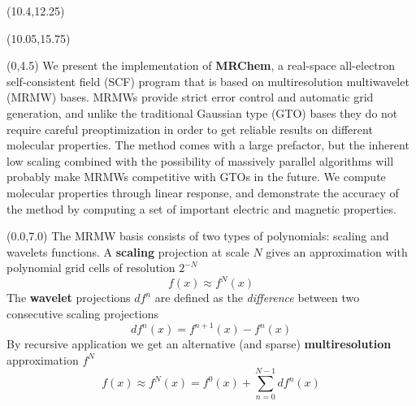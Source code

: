 \documentclass[a0,portrait]{a0poster}
\def\Subhead#1{\noindent{\large\color{DarkBlue} #1}}
\begin{document}
\begin{textblock}{5}(10.4,12.25)
\Subhead{LDA}
\end{textblock}

\begin{textblock}{5}(10.05,15.75)
\Subhead{Hartree-Fock}
\end{textblock}


\begin{textblock}{9.3}(0,4.5)
We present the implementation of \textbf{MRChem}, a real-space all-electron 
self-consistent field (SCF) program that is based on multiresolution 
multiwavelet (MRMW) bases. MRMWs provide strict error control and automatic grid
generation, and unlike the traditional Gaussian type (GTO) bases they do not 
require careful preoptimization in order to get reliable 
results on different molecular properties. The method comes with a large 
prefactor, but the inherent low scaling combined with the possibility of 
massively parallel algorithms will probably make MRMWs competitive with GTOs in 
the future. We compute molecular properties through linear response, and 
demonstrate the accuracy of the method by computing a set of
important electric and magnetic properties.
\end{textblock}

\begin{textblock}{4.3}(0.0,7.0)
The MRMW basis consists of two types of polynomials: scaling and
wavelets functions. A \textbf{scaling} projection at scale $N$ gives an 
approximation with polynomial grid cells of resolution $2^{-N}$
\begin{equation}
	f(x) \approx f^N(x) 
\end{equation}
The \textbf{wavelet} projections $df^n$ are defined as the \emph{difference} 
between two consecutive scaling projections
\begin{equation}
	\label{eq:wavelet}
	df^n(x) = f^{n+1}(x) - f^n(x)
\end{equation}
By recursive application we get an alternative (and sparse)
\textbf{multiresolution} approximation $f^N$
\begin{equation}
	\label{eq:multires}
	f(x) \approx f^N(x) = f^{0}(x) + \sum_{n=0}^{N-1} df^n(x)
\end{equation}
\end{textblock}
\end{document}
